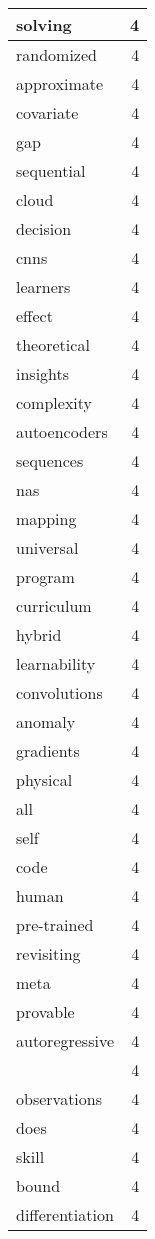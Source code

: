 \begin{table}[h]
\begin{tabular}{|l|r|}
\hline
solving & 4 \\
\hline
randomized & 4 \\
\hline
approximate & 4 \\
\hline
covariate & 4 \\
\hline
gap & 4 \\
\hline
sequential & 4 \\
\hline
cloud & 4 \\
\hline
decision & 4 \\
\hline
cnns & 4 \\
\hline
learners & 4 \\
\hline
effect & 4 \\
\hline
theoretical & 4 \\
\hline
insights & 4 \\
\hline
complexity & 4 \\
\hline
autoencoders & 4 \\
\hline
sequences & 4 \\
\hline
nas & 4 \\
\hline
mapping & 4 \\
\hline
universal & 4 \\
\hline
program & 4 \\
\hline
curriculum & 4 \\
\hline
hybrid & 4 \\
\hline
learnability & 4 \\
\hline
convolutions & 4 \\
\hline
anomaly & 4 \\
\hline
gradients & 4 \\
\hline
physical & 4 \\
\hline
all & 4 \\
\hline
self & 4 \\
\hline
code & 4 \\
\hline
human & 4 \\
\hline
pre-trained & 4 \\
\hline
revisiting & 4 \\
\hline
meta & 4 \\
\hline
provable & 4 \\
\hline
autoregressive & 4 \\
\hline
 & 4 \\
\hline
observations & 4 \\
\hline
does & 4 \\
\hline
skill & 4 \\
\hline
bound & 4 \\
\hline
differentiation & 4 \\

\end{tabular}
\end{table}
